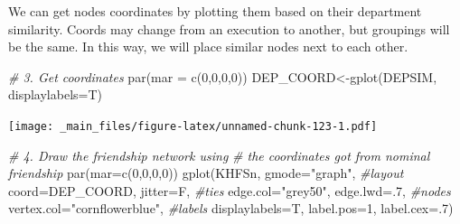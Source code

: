 \documentclass[
  notitlepage,
  onecolumn,
  openany]{book}
\newenvironment{Shaded}{\begin{snugshade}}{\end{snugshade}}
\newcommand{\AttributeTok}[1]{\textcolor[rgb]{0.77,0.63,0.00}{#1}}
\newcommand{\CommentTok}[1]{\textcolor[rgb]{0.56,0.35,0.01}{\textit{#1}}}
\newcommand{\ConstantTok}[1]{\textcolor[rgb]{0.00,0.00,0.00}{#1}}
\newcommand{\DecValTok}[1]{\textcolor[rgb]{0.00,0.00,0.81}{#1}}
\newcommand{\FunctionTok}[1]{\textcolor[rgb]{0.00,0.00,0.00}{#1}}
\newcommand{\NormalTok}[1]{#1}
\newcommand{\OtherTok}[1]{\textcolor[rgb]{0.56,0.35,0.01}{#1}}
\newcommand{\SpecialCharTok}[1]{\textcolor[rgb]{0.00,0.00,0.00}{#1}}
\newcommand{\StringTok}[1]{\textcolor[rgb]{0.31,0.60,0.02}{#1}}
\begin{document}
\begin{Shaded}
\end{Shaded}

We can get nodes coordinates by plotting them based on their department similarity. Coords may change from an execution to another, but groupings will be the same. In this way, we will place similar nodes next to each other.

\begin{Shaded}
\begin{Highlighting}[]
\CommentTok{\# 3. Get coordinates}
\FunctionTok{par}\NormalTok{(}\AttributeTok{mar =} \FunctionTok{c}\NormalTok{(}\DecValTok{0}\NormalTok{,}\DecValTok{0}\NormalTok{,}\DecValTok{0}\NormalTok{,}\DecValTok{0}\NormalTok{))}
\NormalTok{DEP\_COORD}\OtherTok{\textless{}{-}}\FunctionTok{gplot}\NormalTok{(DEPSIM, }
                 \AttributeTok{displaylabels=}\NormalTok{T)}
\end{Highlighting}
\end{Shaded}

\texttt{[image: \_main\_files/figure-latex/unnamed-chunk-123-1.pdf]}

\begin{Shaded}
\begin{Highlighting}[]
\CommentTok{\# 4. Draw the friendship network using }
\CommentTok{\#    the coordinates got from nominal friendship}
\FunctionTok{par}\NormalTok{(}\AttributeTok{mar=}\FunctionTok{c}\NormalTok{(}\DecValTok{0}\NormalTok{,}\DecValTok{0}\NormalTok{,}\DecValTok{0}\NormalTok{,}\DecValTok{0}\NormalTok{))}
\FunctionTok{gplot}\NormalTok{(KHFSn,}
      \AttributeTok{gmode=}\StringTok{"graph"}\NormalTok{,}
      \CommentTok{\#layout}
      \AttributeTok{coord=}\NormalTok{DEP\_COORD,}
      \AttributeTok{jitter=}\NormalTok{F,}
      \CommentTok{\#ties}
      \AttributeTok{edge.col=}\StringTok{"grey50"}\NormalTok{,}
      \AttributeTok{edge.lwd=}\NormalTok{.}\DecValTok{7}\NormalTok{,}
      \CommentTok{\#nodes}
      \AttributeTok{vertex.col=}\StringTok{"cornflowerblue"}\NormalTok{,}
      \CommentTok{\#labels}
      \AttributeTok{displaylabels=}\NormalTok{T, }
      \AttributeTok{label.pos=}\DecValTok{1}\NormalTok{, }
      \AttributeTok{label.cex=}\NormalTok{.}\DecValTok{7}\NormalTok{)}
\end{Highlighting}
\end{Shaded}
\end{document}
